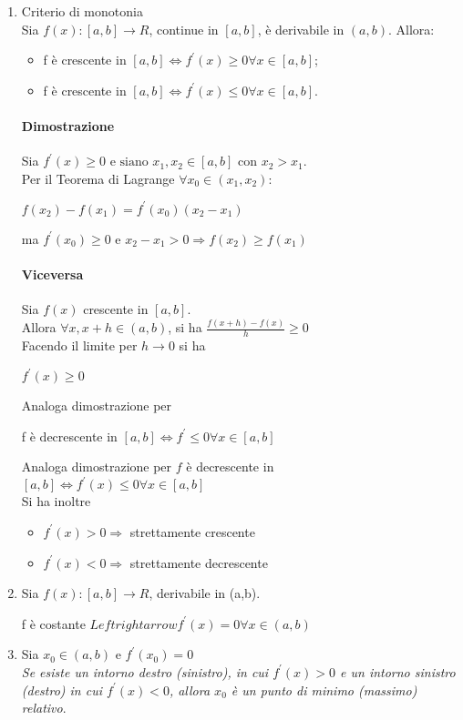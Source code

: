 \begin{enumerate}
	\item Criterio di monotonia\\
		Sia $f(x):[a,b]\to R$, continue in $[a,b]$, è derivabile in $(a,b)$.
		Allora:
		\begin{itemize}
			\item f è crescente in $[a,b]\Leftrightarrow f^\prime(x)\geq 0
				\forall x \in [a,b]$;
			\item f è crescente in $[a,b]\Leftrightarrow f^\prime(x)\leq 0
				\forall x \in [a,b]$.
		\end{itemize}
		\paragraph{Dimostrazione}
		Sia $f^\prime (x)\geq 0 \text{ e siano } x_1,x_2\in[a,b]\text{ con }
		x_2>x_1$.\\
		Per il Teorema di Lagrange $\forall x_0\in (x_1,x_2)$:	
			\begin{center}
				$f(x_2)-f(x_1)=f^\prime(x_0)(x_2-x_1)$
			\end{center}
			ma $f^\prime(x_0)\geq 0$ e $x_2-x_1>0 \Rightarrow f(x_2)\geq f(x_1)$
		\paragraph{Viceversa} Sia $f(x)$ crescente in $[a,b]$.\\
		Allora $\forall x, x+h\in (a,b)$, si ha $\frac{f(x+h)-f(x)}{h}\geq 0$\\
		Facendo il limite per $h\to 0$ si ha
		\begin{center}
			$f^\prime(x)\geq 0$
		\end{center}
		Analoga dimostrazione per
		\begin{center}
			f è decrescente in $[a,b]\Leftrightarrow f^\prime\leq 0 \forall
			x\in [a,b]$
		\end{center}
		Analoga dimostrazione per $f$ è decrescente in $[a,b]\Leftrightarrow
		f^\prime(x)\leq 0 \forall x \in [a,b]$\\
		Si ha inoltre
		\begin{itemize}
			\item $f^\prime (x)>0\Rightarrow$ strettamente crescente
			\item $f^\prime (x)<0\Rightarrow$ strettamente decrescente
		\end{itemize}
	\item Sia $f(x):[a,b]\to R$, derivabile in (a,b).
		\begin{center}
			f è costante $Leftrightarrow f^\prime (x)=0 \forall x\in(a,b)$
		\end{center}
	\item Sia $x_0\in (a,b)$ e $f^\prime (x_0)=0$\\
		\textit{Se esiste un intorno destro (sinistro), in cui $f^\prime (x)>0$
		e un intorno sinistro (destro) in cui $f^\prime (x)<0$, allora $x_0$ è
		un punto di minimo (massimo) relativo}.
\end{enumerate}
